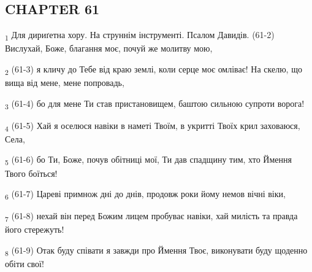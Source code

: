 \subsection{CHAPTER 61}
\begin{tcolorbox}
\textsubscript{1} Для дириґетна хору. На струннім інструменті. Псалом Давидів. (61-2) Вислухай, Боже, благання моє, почуй же молитву мою,
\end{tcolorbox}
\begin{tcolorbox}
\textsubscript{2} (61-3) я кличу до Тебе від краю землі, коли серце моє омліває! На скелю, що вища від мене, мене попровадь,
\end{tcolorbox}
\begin{tcolorbox}
\textsubscript{3} (61-4) бо для мене Ти став пристановищем, баштою сильною супроти ворога!
\end{tcolorbox}
\begin{tcolorbox}
\textsubscript{4} (61-5) Хай я оселюся навіки в наметі Твоїм, в укритті Твоїх крил заховаюся, Села,
\end{tcolorbox}
\begin{tcolorbox}
\textsubscript{5} (61-6) бо Ти, Боже, почув обітниці мої, Ти дав спадщину тим, хто Ймення Твого боїться!
\end{tcolorbox}
\begin{tcolorbox}
\textsubscript{6} (61-7) Цареві примнож дні до днів, продовж роки йому немов вічні віки,
\end{tcolorbox}
\begin{tcolorbox}
\textsubscript{7} (61-8) нехай він перед Божим лицем пробуває навіки, хай милість та правда його стережуть!
\end{tcolorbox}
\begin{tcolorbox}
\textsubscript{8} (61-9) Отак буду співати я завжди про Ймення Твоє, виконувати буду щоденно обіти свої!
\end{tcolorbox}
